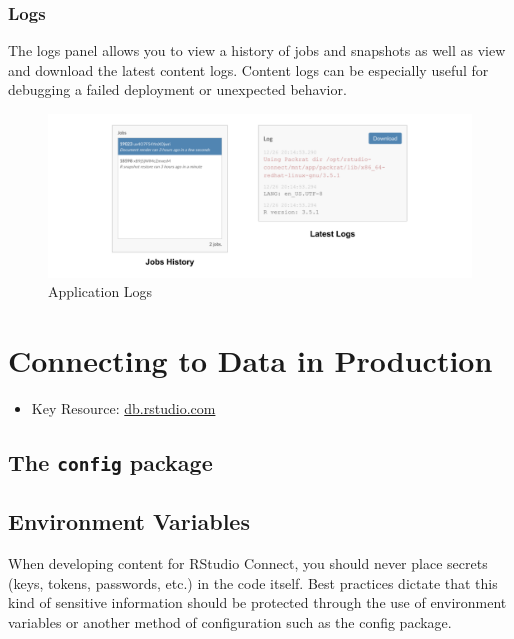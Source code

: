 \documentclass[]{book}
\providecommand{\tightlist}{%
  \setlength{\itemsep}{0pt}\setlength{\parskip}{0pt}}
\theoremstyle{definition}
\theoremstyle{definition}
\theoremstyle{definition}
\theoremstyle{remark}
\begin{document}
\hypertarget{logs}{%
\subsection{Logs}\label{logs}}

The logs panel allows you to view a history of jobs and snapshots as
well as view and download the latest content logs. Content logs can be
especially useful for debugging a failed deployment or unexpected
behavior.

\begin{figure}
\centering
\includegraphics{imgs/deployment/rsc-logs.png}
\caption{Application Logs}
\end{figure}

\hypertarget{connecting-to-data-in-production}{%
\chapter{Connecting to Data in
Production}\label{connecting-to-data-in-production}}

\begin{itemize}
\tightlist
\item
  Key Resource: \url{db.rstudio.com}
\end{itemize}

\hypertarget{the-config-package}{%
\section{\texorpdfstring{The \texttt{config}
package}{The config package}}\label{the-config-package}}

\hypertarget{environment-variables}{%
\section{Environment Variables}\label{environment-variables}}

When developing content for RStudio Connect, you should never place
secrets (keys, tokens, passwords, etc.) in the code itself. Best
practices dictate that this kind of sensitive information should be
protected through the use of environment variables or another method of
configuration such as the config package.
\end{document}
